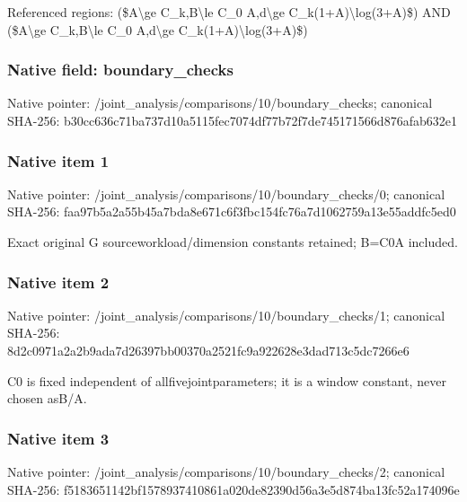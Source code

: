 \documentclass[10pt,a4paper]{article}
\begin{document}
\begingroup\raggedright\sloppy Referenced regions:\allowbreak{} (\$A\textbackslash{}ge C\_\allowbreak{}k,\allowbreak{}B\textbackslash{}le C\_\allowbreak{}0 A,\allowbreak{}d\textbackslash{}ge C\_\allowbreak{}k(1+A)\textbackslash{}log(3+A)\$) AND (\$A\textbackslash{}ge C\_\allowbreak{}k,\allowbreak{}B\textbackslash{}le C\_\allowbreak{}0 A,\allowbreak{}d\textbackslash{}ge C\_\allowbreak{}k(1+A)\textbackslash{}log(3+A)\$)\par\endgroup

\subsubsection{Native field: boundary\_\allowbreak{}checks}
Native pointer: /joint\_\allowbreak{}analysis/comparisons/10/boundary\_\allowbreak{}checks; canonical SHA-256: b30cc636c71ba737d10a5115fec7074df77b72f7de745171566d876afab632e1

\subsubsection{Native item 1}
Native pointer: /joint\_\allowbreak{}analysis/comparisons/10/boundary\_\allowbreak{}checks/0; canonical SHA-256: faa97b5a2a55b45a7bda8e671c6f3fbc154fc76a7d1062759a13e55addfc5ed0

\begingroup\raggedright\sloppy Exact original G sourceworkload/\allowbreak{}dimension constants retained;\allowbreak{} B=\allowbreak{}C0A included.\par\endgroup

\subsubsection{Native item 2}
Native pointer: /joint\_\allowbreak{}analysis/comparisons/10/boundary\_\allowbreak{}checks/1; canonical SHA-256: 8d2c0971a2a2b9ada7d26397bb00370a2521fc9a922628e3dad713c5dc7266e6

\begingroup\raggedright\sloppy C0 is fixed independent of allfivejointparameters;\allowbreak{} it is a window constant,\allowbreak{} never chosen asB/\allowbreak{}A.\par\endgroup

\subsubsection{Native item 3}
Native pointer: /joint\_\allowbreak{}analysis/comparisons/10/boundary\_\allowbreak{}checks/2; canonical SHA-256: f5183651142bf1578937410861a020de82390d56a3e5d874ba13fc52a174096e
\end{document}
